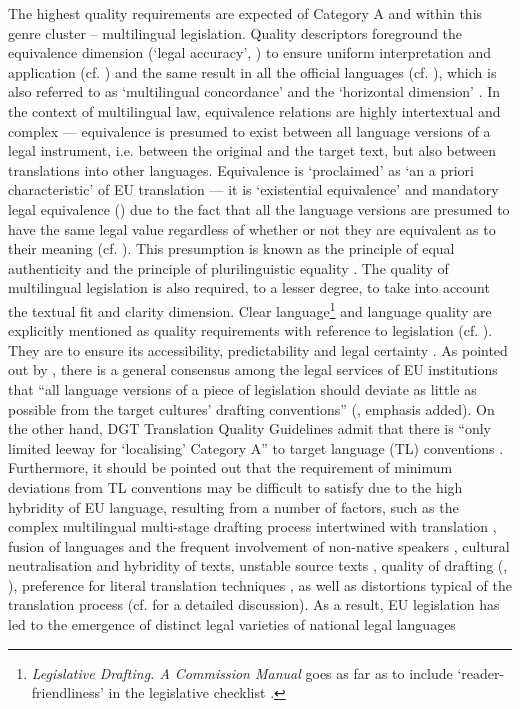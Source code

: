 \documentclass[output=paper]{langsci/langscibook}
\begin{document}
The highest quality requirements are expected of Category A and within this genre cluster – multilingual legislation. Quality descriptors foreground the equivalence dimension (‘legal accuracy’, \citealt[6]{DGT2016b}) to ensure uniform interpretation and application (cf. \citealt[72]{Šarčević1997}) and the same result in all the official languages (cf. \citealt[1191]{Pozzo2012b}), which is also referred to as ‘multilingual concordance’ \citep[4]{DGT2016b} and the ‘horizontal dimension’ \citep[44]{Robertson2015}. In the context of multilingual law, equivalence relations are highly intertextual and complex — equivalence is presumed to exist between all language versions of a legal instrument, i.e. between the original and the target text, but also between translations into other languages. Equivalence is ‘proclaimed’ \citep[11]{Hermans2007} as ‘an a priori characteristic’ of EU translation \citep[49]{Koskinen2000} — it is ‘existential equivalence’ \citep[51]{Koskinen2000} and mandatory legal equivalence (\citealt[180–181]{Tosi2002}) due to the fact that all the language versions are presumed to have the same legal value regardless of whether or not they are equivalent as to their meaning (cf. \citealt[180]{Tosi2002}). This presumption is known as the principle of equal authenticity \citep[64]{Šarčević1997} and the principle of plurilinguistic equality \citep{vanEls2001}. The quality of multilingual legislation is also required, to a lesser degree, to take into account the textual fit and clarity dimension. Clear language\footnote{\textit{Legislative Drafting. A Commission Manual} goes as far as to include ‘reader-friendliness’ in the legislative checklist \citep[78]{EuropeanCommission1997}.} and language quality are explicitly mentioned as quality requirements with reference to legislation (cf. \citealt[6]{DGT2016b}). They are to ensure its accessibility, predictability and legal certainty \citep[146]{Strandvik2015}. As pointed out by \citeauthor{Strandvik2015}, there is a general consensus among the legal services of EU institutions that “all language versions of a piece of legislation should deviate as little as possible from the target cultures’ drafting conventions” (\citeyear[153]{Strandvik2015}, emphasis added). On the other hand, DGT Translation Quality Guidelines admit that there is “only limited leeway for ‘localising’ Category A” to target language (TL) conventions \citep[14]{DGT2016b}. Furthermore, it should be pointed out that the requirement of minimum deviations from TL conventions may be difficult to satisfy due to the high hybridity of EU language, resulting from a number of factors, such as the complex multilingual multi-stage drafting process intertwined with translation \citep[360]{Doczekalska2009paradoxes}, fusion of languages and the frequent involvement of non-native speakers \citep[76]{WagnerEtAl2002}, cultural neutralisation and hybridity of texts, unstable source texts \citep{Stefaniak2013}, quality of drafting (\citealt[184]{Tosi2002}, \citealt[22]{Šarčević2013}), preference for literal translation techniques \citep[54]{Koskinen2000}, as well as distortions typical of the translation process (cf. \citealt{Biel2014} for a detailed discussion). As a result, EU legislation has led to the emergence of distinct legal varieties of national legal languages 
\end{document}
